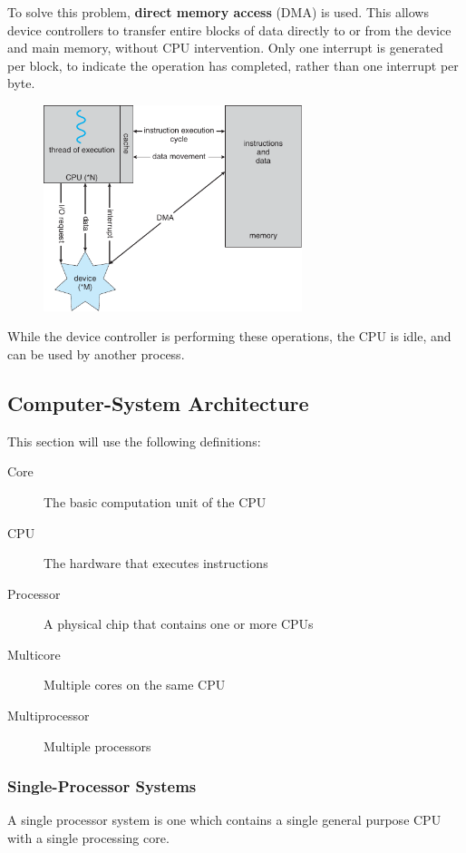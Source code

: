 \documentclass{article}
\begin{document}
To solve this problem, \textbf{direct memory access} (DMA) is used.
This allows device controllers to transfer entire blocks of data
directly to or from the device and main memory, without CPU
intervention. Only one interrupt is generated per block, to indicate
the operation has completed, rather than one interrupt per byte.
\begin{figure}[H]
    \centering
    \includegraphics[height = 6cm]{figures/dma.pdf}
\end{figure}
While the device controller is performing these operations, the CPU is
idle, and can be used by another process.
\subsection{Computer-System Architecture}
\begin{tcolorboxlarge}[title={Definitions}, parbox=false]
    This section will use the following definitions:
    \begin{description}
        \item[Core] The basic computation unit of the CPU
        \item[CPU] The hardware that executes instructions
        \item[Processor] A physical chip that contains one or more CPUs
        \item[Multicore] Multiple cores on the same CPU
        \item[Multiprocessor] Multiple processors
    \end{description}
\end{tcolorboxlarge}
\subsubsection{Single-Processor Systems}
A single processor system is one which contains a single general
purpose CPU with a single processing core.
\end{document}
